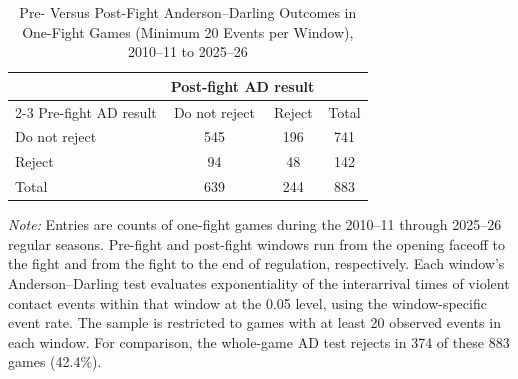 \begin{table}[htbp]
\centering
\caption{Pre- Versus Post-Fight Anderson--Darling Outcomes in One-Fight Games (Minimum 20 Events per Window), 2010--11 to 2025--26}
\label{tab:one_fight_AD_rejection_min_20_20102011_20252026}
\small
\renewcommand{\arraystretch}{1.15}
\setlength{\tabcolsep}{6pt}

\begin{tabular*}{0.78\textwidth}{@{\extracolsep{\fill}}lccc}
\toprule
 & \multicolumn{2}{c}{Post-fight AD result} & \\
\cmidrule(lr){2-3}
Pre-fight AD result & Do not reject & Reject & Total \\
\midrule
Do not reject & 545 & 196 & 741 \\
Reject & 94 & 48 & 142 \\
\midrule
Total & 639 & 244 & 883 \\
\bottomrule
\end{tabular*}

\vspace{0.4em}
\parbox{0.78\textwidth}{
\footnotesize
\textit{Note:} Entries are counts of one-fight games during the 2010--11 through 2025--26 regular seasons. Pre-fight and post-fight windows run from the opening faceoff to the fight and from the fight to the end of regulation, respectively. Each window's Anderson--Darling test evaluates exponentiality of the interarrival times of violent contact events within that window at the 0.05 level, using the window-specific event rate. The sample is restricted to games with at least 20 observed events in each window. For comparison, the whole-game AD test rejects in 374 of these 883 games (42.4\%).
}
\end{table}
